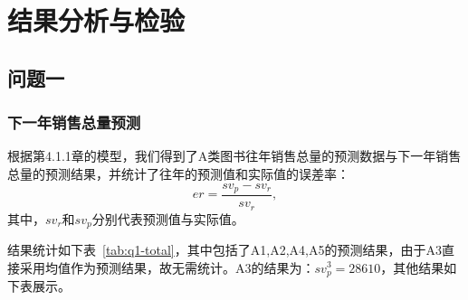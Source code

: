 \documentclass[bwprint]{gmcmthesis}
\begin{document}

\newpage

\section{结果分析与检验}

\subsection{问题一}

\subsubsection{下一年销售总量预测}

根据第4.1.1章的模型，我们得到了A类图书往年销售总量的预测数据与下一年销售总量的预测结果，并统计了往年的预测值和实际值的误差率：
\begin{equation}
\label{eq:er}
  er = \frac{sv_p - sv_r}{sv_r},
\end{equation}
其中，$sv_r$和$sv_p$分别代表预测值与实际值。

结果统计如下表~\ref{tab:q1-total}，其中包括了A1,A2,A4,A5的预测结果，由于A3直接采用均值作为预测结果，故无需统计。A3的结果为：$sv^3_p=28610$，其他结果如下表展示。
\end{document}
